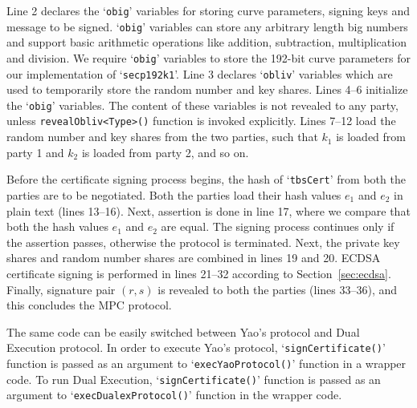 Line 2 declares the `\texttt{obig}' variables for storing curve parameters, signing keys and message to be signed. `\texttt{obig}' variables can store any arbitrary length big numbers and support basic arithmetic operations like addition, subtraction, multiplication and division. We require `\texttt{obig}' variables to store the 192-bit curve parameters for our implementation of `\texttt{secp192k1}'. Line 3 declares `\texttt{obliv}' variables which are used to temporarily store the random number and key shares. Lines 4--6 initialize the `\texttt{obig}' variables. The content of these variables is not revealed to any party, unless \texttt{revealObliv<Type>()} function is invoked explicitly. Lines 7--12 load the random number and key shares from the two parties, such that $k_1$ is loaded from party 1 and $k_2$ is loaded from party 2, and so on.

Before the certificate signing process begins, the hash of `\texttt{tbsCert}' from both the parties are to be negotiated. Both the parties load their hash values $e_1$ and $e_2$ in plain text (lines 13--16). Next, assertion is done in line 17, where we compare that both the hash values $e_1$ and $e_2$ are equal. The signing process continues only if the assertion passes, otherwise the protocol is terminated. Next, the private key shares and random number shares are combined in lines 19 and 20. ECDSA certificate signing is performed in lines 21--32 according to Section~\ref{sec:ecdsa}. Finally, signature pair $(r, s)$ is revealed to both the parties (lines 33--36), and this concludes the MPC protocol.

The same code can be easily switched between Yao's protocol and Dual Execution protocol. In order to execute Yao's protocol, `\texttt{signCertificate()}' function is passed as an argument to `\texttt{execYaoProtocol()}' function in a wrapper code. To run Dual Execution, `\texttt{signCertificate()}' function is passed as an argument to `\texttt{execDualexProtocol()}' function in the wrapper code.